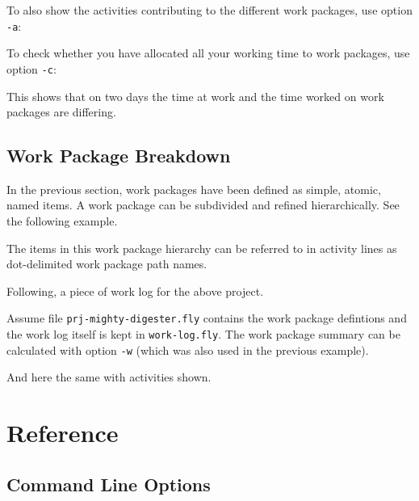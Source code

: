 \documentclass[11pt]{article}
\begin{document}


To also show the activities contributing to the different work packages, use option \verb:-a::



To check whether you have allocated all your working time to work packages, use option \verb:-c::



This shows that on two days the time at work and the time worked on work packages are differing.

\subsection{Work Package Breakdown}

In the previous section, work packages have been defined as simple, atomic, named items. A work package can be subdivided and refined hierarchically. See the following example.



The items in this work package hierarchy can be referred to in activity lines as dot-delimited work package path names.

Following, a piece of work log for the above project.



Assume file \verb:prj-mighty-digester.fly: contains the work package defintions and the work log itself is kept in \verb:work-log.fly:. The work package summary can be calculated with option \verb:-w: (which was also used in the previous example).



And here the same with activities shown.




\section{Reference}

\subsection{Command Line Options}
\end{document}
